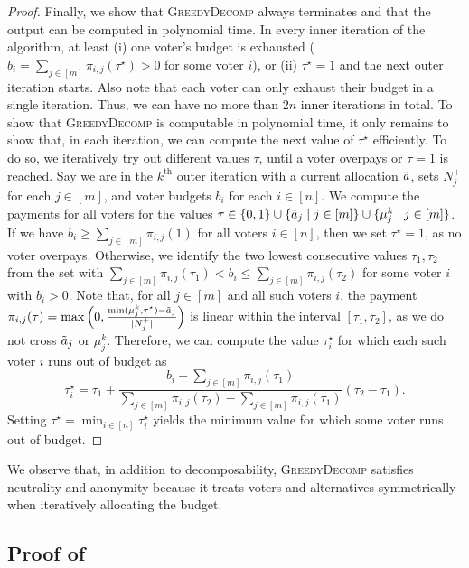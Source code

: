 \documentclass[11pt]{article}
\newcommand{\GrdDec}{\textsc{GreedyDecomp} }
\begin{document}
\begin{proof}
    Finally, we show that \GrdDec always terminates and that the output can be computed in polynomial time.
    In every inner iteration of the algorithm, at least (i) one voter's budget is exhausted ($b_i = \sum_{j \in [m]} \pi_{i,j}(\tau^\star)>0$ for some voter $i$), or (ii) $\tau^\star = 1$ and the next outer iteration starts. 
    Also note that each voter can only exhaust their budget in a single iteration. Thus, we can have no more than $2n$ inner iterations in total.
    To show that \GrdDec is computable in polynomial time, it only remains to show that, in each iteration, we can compute the next value of $\tau^\star$ efficiently. To do so, we iteratively try out different values $\tau$, until a voter overpays or $\tau = 1$ is reached. 
    Say we are in the $k^\text{th}$ outer iteration with a current allocation $\Tilde{a}$, sets $N_j^+$ for each $j \in [m]$, and voter budgets $b_i$ for each $i \in [n]$. 
    We compute the payments for all voters for the values $\tau \in \{0, 1\} \cup \{\Tilde{a}_j \mid j \in [m]\} \cup \{ \mu^k_j \mid j\in[m] \}$. If we have $b_i \ge \sum_{j \in [m]} \pi_{i,j}(1)$ for all voters $i \in [n]$, then we set $\tau^\star = 1$, as no voter overpays. 
    Otherwise, we identify the two lowest consecutive values $\tau_1, \tau_2$ from the set with $\sum_{j \in [m]} \pi_{i,j}(\tau_1) < b_i \le \sum_{j \in [m]} \pi_{i,j}(\tau_2)$ for some voter $i$ with $b_i > 0$. 
    Note that, for all $j \in [m]$ and all such voters $i$, the payment $\pi_{i,j}(\tau) = \max \Big(0, \frac{\min(\mu^k_j, \tau^\star) - \Tilde{a}_j}{|N_j^+|}\Big)$ is linear within the interval $[\tau_1, \tau_2]$, as we do not cross $\Tilde{a}_j$ or $\mu^k_j$. 
    Therefore, we can compute the value $\tau^\star_i$ for which each such voter $i$ runs out of budget as
    $$\tau^\star_i = \tau_1 + \frac{b_i - \sum_{j \in [m]} \pi_{i,j}(\tau_1)}{\sum_{j \in [m]} \pi_{i,j}(\tau_2) - \sum_{j \in [m]} \pi_{i,j}(\tau_1)} (\tau_2 - \tau_1).$$
    Setting $\tau^\star = \min_{i \in [n]} \tau^\star_i$ yields the minimum value for which some voter runs out of budget.
\end{proof}

We observe that, in addition to decomposability, \GrdDec satisfies neutrality and anonymity because it treats voters and alternatives symmetrically when iteratively allocating the budget.

\subsection{Proof of }\label{app:propAlphaStar}
\end{document}
